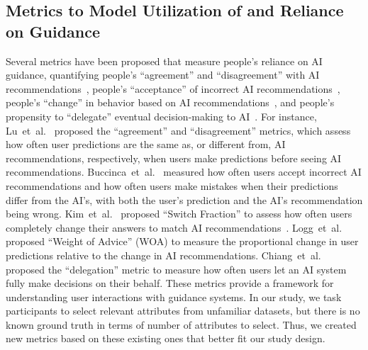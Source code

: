 \subsection{Metrics to Model Utilization of and Reliance on Guidance}
Several metrics have been proposed that measure people's reliance on AI guidance, quantifying people's ``agreement'' and ``disagreement'' with AI recommendations~\cite{lu2021human}, people's ``acceptance'' of incorrect AI recommendations~\cite{buccinca2021trust}, 
people's ``change'' in behavior based on AI recommendations~\cite{kim2023algorithms, logg2019algorithm}, 
and people's propensity to ``delegate'' eventual decision-making to AI~\cite{chiang2021you}. 
For instance, 
Lu~et~al.~\cite{lu2021human} proposed the ``agreement'' and ``disagreement'' metrics, which assess how often user predictions are the same as, or different from, AI recommendations, respectively, when users make predictions before seeing AI recommendations.
Buccinca~et~al.~\cite{buccinca2021trust} measured how often users accept incorrect AI recommendations and how often users make mistakes when their predictions differ from the AI's, with both the user's prediction and the AI's recommendation being wrong.
Kim~et~al.~\cite{kim2023algorithms} proposed ``Switch Fraction'' to assess how often users completely change their answers to match AI recommendations~\cite{kim2023algorithms}.
Logg~et~al.~\cite{logg2019algorithm} proposed ``Weight of Advice'' (WOA) to measure the proportional change in user predictions relative to the change in AI recommendations. 
Chiang~et~al.~\cite{chiang2021you} proposed the ``delegation'' metric to measure how often users let an AI system fully make decisions on their behalf.
These metrics provide a framework for understanding user interactions with guidance systems. In our study, we task participants to select relevant attributes from unfamiliar datasets, but there is no known ground truth in terms of number of attributes to select. Thus, we created new metrics based on these existing ones that better fit our study design.

